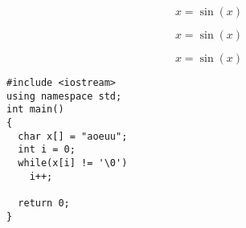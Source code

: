 \documentclass[12pt, final, a4paper, oneside]{extarticle}
\begin{document}
\begin{equation}
  \label{eq:1}
  x = \sin(x)
\end{equation}

\begin{equation}
  x = \sin(x)
\end{equation}

\begin{equation}
  \label{eq:2}
  x = \sin(x)
\end{equation}

\newpage
\begin{lstlisting}[caption={Быдлокод}, captionpos=b]
#include <iostream>
using namespace std;
int main()
{
  char x[] = "aoeuu";
  int i = 0;
  while(x[i] != '\0')
    i++;
  
  return 0;
}
\end{lstlisting}
\end{document}
